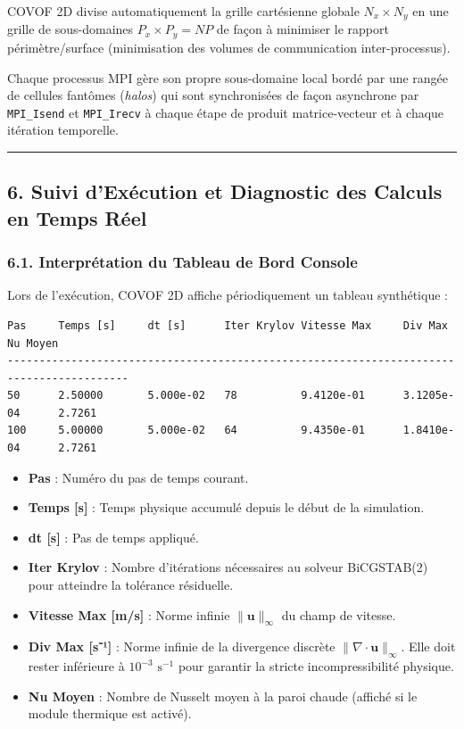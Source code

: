 \documentclass[
  french,
]{article}
\providecommand{\tightlist}{%
  \setlength{\itemsep}{0pt}\setlength{\parskip}{0pt}}
\begin{document}
COVOF 2D divise automatiquement la grille cartésienne globale
\(N_x \times N_y\) en une grille de sous-domaines
\(P_x \times P_y = NP\) de façon à minimiser le rapport
périmètre/surface (minimisation des volumes de communication
inter-processus).

Chaque processus MPI gère son propre sous-domaine local bordé par une
rangée de cellules fantômes (\emph{halos}) qui sont synchronisées de
façon asynchrone par \texttt{MPI\_Isend} et \texttt{MPI\_Irecv} à chaque
étape de produit matrice-vecteur et à chaque itération temporelle.

\begin{center}\rule{0.5\linewidth}{0.5pt}\end{center}

\subsection{6. Suivi d'Exécution et Diagnostic des Calculs en Temps
Réel}\label{suivi-dexuxe9cution-et-diagnostic-des-calculs-en-temps-ruxe9el}

\subsubsection{6.1. Interprétation du Tableau de Bord
Console}\label{interpruxe9tation-du-tableau-de-bord-console}

Lors de l'exécution, COVOF 2D affiche périodiquement un tableau
synthétique :

\begin{verbatim}
Pas     Temps [s]     dt [s]      Iter Krylov Vitesse Max     Div Max         Nu Moyen
-----------------------------------------------------------------------------------------
50      2.50000       5.000e-02   78          9.4120e-01      3.1205e-04      2.7261
100     5.00000       5.000e-02   64          9.4350e-01      1.8410e-04      2.7261
\end{verbatim}

\begin{itemize}
\tightlist
\item
  \textbf{Pas} : Numéro du pas de temps courant.
\item
  \textbf{Temps {[}s{]}} : Temps physique accumulé depuis le début de la
  simulation.
\item
  \textbf{dt {[}s{]}} : Pas de temps appliqué.
\item
  \textbf{Iter Krylov} : Nombre d'itérations nécessaires au solveur
  BiCGSTAB(2) pour atteindre la tolérance résiduelle.
\item
  \textbf{Vitesse Max {[}m/s{]}} : Norme infinie
  \(\|\mathbf{u}\|_\infty\) du champ de vitesse.
\item
  \textbf{Div Max {[}s⁻¹{]}} : Norme infinie de la divergence discrète
  \(\|\nabla \cdot \mathbf{u}\|_\infty\). Elle doit rester inférieure à
  \(10^{-3}\text{ s}^{-1}\) pour garantir la stricte incompressibilité
  physique.
\item
  \textbf{Nu Moyen} : Nombre de Nusselt moyen à la paroi chaude (affiché
  si le module thermique est activé).
\end{itemize}
\end{document}
